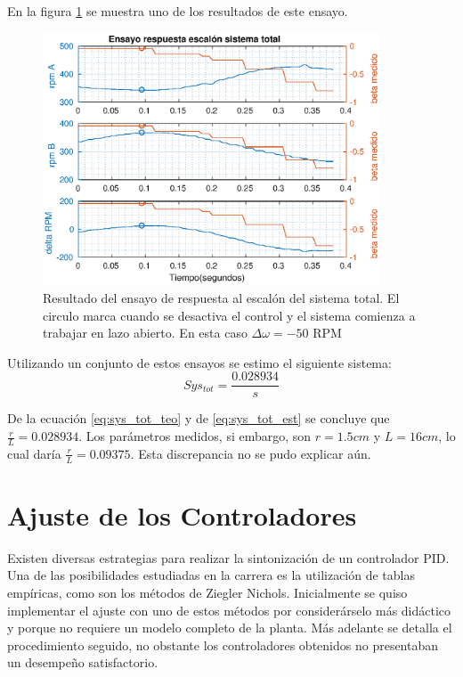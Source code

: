 \documentclass[10pt,conference,a4paper,onecolumn]{article}%
\begin{document}
En la figura \ref{fig:ensayoSistTotal} se muestra uno de los resultados de este ensayo.
\begin{figure}
\centering
\includegraphics[width=10cm]{./imagenes/resp_escalon_sys_total}
\caption{Resultado del ensayo de respuesta al escalón del sistema total. El circulo marca cuando se desactiva el control y el sistema comienza a trabajar en lazo abierto. En esta caso $\Delta \omega=-50 $ RPM}
\label{fig:ensayoSistTotal}
\end{figure}
Utilizando un conjunto de estos ensayos se estimo el siguiente sistema:
\begin{equation}
Sys_{tot}= \frac{0.028934}{s}  
\label{eq:sys_tot_est}
\end{equation}

De la ecuación \ref{eq:sys_tot_teo} y de \ref{eq:sys_tot_est}  se concluye que $\frac{r}{L}=0.028934 $. Los parámetros medidos, si embargo, son $r=1.5cm$ y $L=16cm$, lo cual daría $\frac{r}{L}=0.09375 $. Esta discrepancia no se pudo explicar aún.   

\section{Ajuste de los Controladores} \label{sec:ajus_control}
Existen diversas estrategias para realizar la sintonización de un controlador PID. Una de las posibilidades estudiadas en la carrera es la utilización de tablas empíricas, como son los métodos de Ziegler Nichols. Inicialmente se quiso implementar el ajuste con uno de estos métodos por considerárselo más didáctico y porque no requiere un modelo completo de la planta. Más adelante se detalla el procedimiento seguido, no obstante los controladores obtenidos no presentaban un desempeño satisfactorio.
\end{document}
